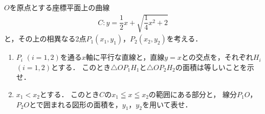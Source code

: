\documentclass[../../main.tex]{subfiles}
\begin{document}
$O$を原点とする座標平面上の曲線
\begin{align*}
  C:y=\dfrac{1}{2}x+\sqrt{\dfrac{1}{4}x^2+2}
\end{align*}
と，その上の相異なる2点$P_1(x_1,y_1)$，$P_2(x_2,y_2)$を考える．
\begin{enumerate}
  \item $P_i$ $(i=1,2)$を通る$x$軸に平行な直線と，直線$y=x$との交点を，それぞれ$H_i$ $(i=1,2)$とする．
    このとき$\triangle OP_1H_1$と$\triangle OP_2H_2$の面積は等しいことを示せ．
  \item $x_1<x_2$とする．
    このとき$C$の$x_1 \leqq x \leqq x_2$の範囲にある部分と，
    線分$P_1O$，$P_2O$とで囲まれる図形の面積を，$y_1$，$y_2$を用いて表せ．
\end{enumerate}
\end{document}
